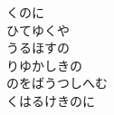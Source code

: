 \documentclass[10pt,b5j]{tarticle} %
\begin{document}
\begin{enumerate}
\begin{minipage}[c]{\blocksize}
        \vspace{\linespace}
        \item
        くのに\\
        ひてゆくや\\
        うるほすの\\
        りゆかしきの\\
        のをばうつしへむ\\
        くはるけきのに
    
    \end{minipage}
\end{enumerate} %
\end{document}
